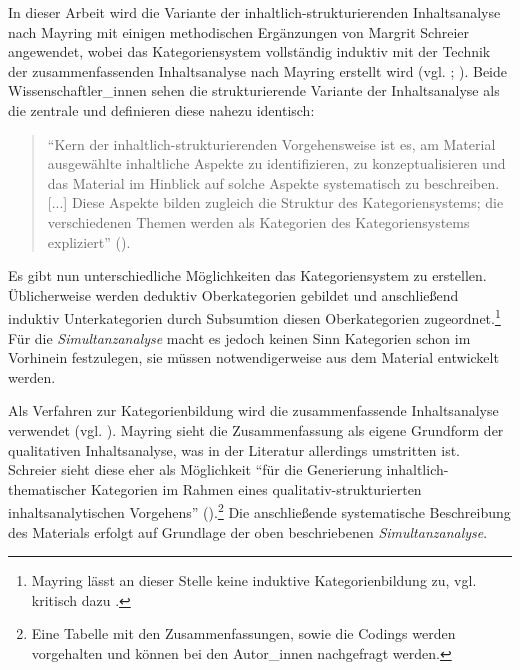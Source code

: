\documentclass[12pt, titlepage=true, toc=bib]{scrartcl}
\begin{document}
In dieser Arbeit wird die Variante der inhaltlich-strukturierenden Inhaltsanalyse nach Mayring mit einigen methodischen Ergänzungen von Margrit Schreier angewendet, wobei das Kategoriensystem vollständig induktiv mit der Technik der zusammenfassenden Inhaltsanalyse nach Mayring erstellt wird (vgl. \cite{mayring_qualitative_2010}; \cite{schreier_varianten_2014}). Beide Wissenschaftler\_innen sehen die strukturierende Variante der Inhaltsanalyse als die zentrale und definieren diese nahezu identisch:

\begin{singlespace*}
\begin{quote}
"`Kern der inhaltlich-strukturierenden Vorgehensweise ist es, am Material ausgewählte inhaltliche Aspekte zu identifizieren, zu konzeptualisieren und das Material im Hinblick auf solche Aspekte systematisch zu beschreiben. [...] Diese Aspekte bilden zugleich die Struktur des Kategoriensystems; die verschiedenen Themen werden als Kategorien des Kategoriensystems expliziert"' (\cite[5]{schreier_varianten_2014}).
\end{quote}
\end{singlespace*}

\noindent Es gibt nun unterschiedliche Möglichkeiten das Kategoriensystem zu erstellen. Üblicherweise werden deduktiv Oberkategorien gebildet und anschließend induktiv Unterkategorien durch Subsumtion diesen Oberkategorien zugeordnet.\footnote{Mayring lässt an dieser Stelle keine induktive Kategorienbildung zu, vgl. kritisch dazu \textcite[Kap. II.4]{steigleder_strukturierende_2008}.} Für die \textit{Simultanzanalyse} macht es jedoch keinen Sinn Kategorien schon im Vorhinein festzulegen, sie müssen notwendigerweise aus dem Material entwickelt werden. 

Als Verfahren zur Kategorienbildung wird die zusammenfassende Inhaltsanalyse verwendet (vgl. \cite[Kap. 5.5.2]{mayring_qualitative_2010}). Mayring sieht die Zusammenfassung als eigene Grundform der qualitativen Inhaltsanalyse, was in der Literatur allerdings umstritten ist. Schreier sieht diese eher als Möglichkeit "`für die Generierung inhaltlich-thematischer Kategorien im Rahmen eines qualitativ-strukturierten inhaltsanalytischen Vorgehens"' (\cite[14]{schreier_varianten_2014}).\footnote{Eine Tabelle mit den Zusammenfassungen, sowie die Codings werden vorgehalten und können bei den Autor\_innen nachgefragt werden.} Die anschließende systematische Beschreibung des Materials erfolgt auf Grundlage der oben beschriebenen \textit{Simultanzanalyse}.
\end{document}
